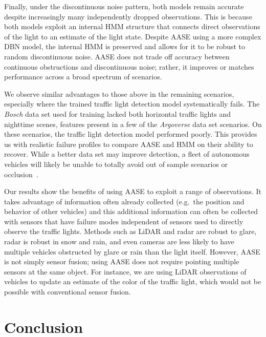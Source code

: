 \documentclass[letterpaper,10pt,conference]{ieeeconf}
\begin{document}
Finally, under the discontinuous noise pattern, both models remain accurate despite increasingly many independently dropped observations. This is because both models exploit an internal HMM structure that connects direct observations of the light to an estimate of the light state. Despite AASE using a more complex DBN model, the internal HMM is preserved and allows for it to be robust to random discontinuous noise. AASE does not trade off accuracy between continuous obstructions and discontinuous noise; rather, it improves or matches performance across a broad spectrum of scenarios.

We observe similar advantages to those above in the remaining scenarios, especially where the trained traffic light detection model systematically fails. The \emph{Bosch} data set used for training lacked both horizontal traffic lights and nighttime scenes, features present in a few of the \emph{Argoverse} data set scenarios. On these scenarios, the traffic light detection model performed poorly. This provides us with realistic failure profiles to compare AASE and HMM on their ability to recover. While a better data set may improve detection, a fleet of autonomous vehicles will likely be unable to totally avoid out of sample scenarios or occlusion~\cite{webb2020waymos}.

Our results show the benefits of using AASE to exploit a range of observations. It takes advantage of information often already collected (e.g.\ the position and behavior of other vehicles) and this additional information can often be collected with sensors that have failure modes independent of sensors used to directly observe the traffic lights. Methods such as LiDAR and radar are robust to glare, radar is robust in snow and rain, and even cameras are less likely to have multiple vehicles obstructed by glare or rain than the light itself. However, AASE is not simply sensor fusion; using AASE does not require pointing multiple sensors at the same object. For instance, we are using LiDAR observations of vehicles to update an estimate of the color of the traffic light, which would not be possible with conventional sensor fusion.

\section{Conclusion}
\end{document}
